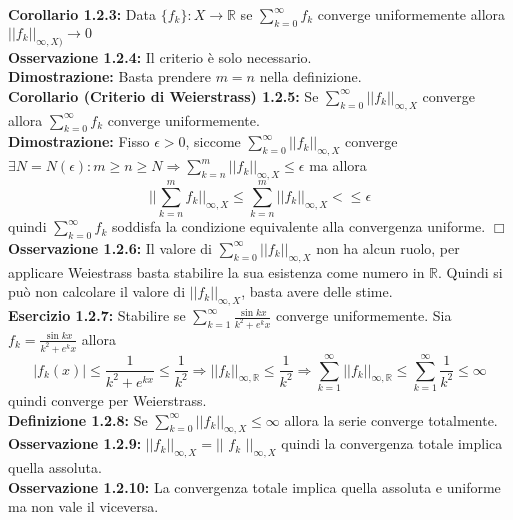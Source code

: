 \documentclass[a4paper,11pt,titlepage]{book}
\begin{document}
\textbf{Corollario 1.2.3:} Data $\{f_{k}\}:X\rightarrow\mathbb{R}$ se $\sum_{k=0}^\infty f_{k}$ converge uniformemente allora $||f_k||_{\infty,X)}\to 0$\\

\textbf{Osservazione 1.2.4:} Il criterio è solo necessario.\\

\textbf{Dimostrazione:} Basta prendere $m=n$ nella definizione. \\

\textbf{Corollario (Criterio di Weierstrass) 1.2.5:} Se $\sum_{k=0}^{\infty}||f_k||_{\infty,X}$ converge allora $\sum_{k=0}^{\infty}f_k$ converge uniformemente. \\

\textbf{Dimostrazione:} Fisso $\epsilon >0$, siccome $\sum_{k=0}^{\infty}||f_k||_{\infty,X}$ converge $\exists N=N(\epsilon): m\geq n\geq N \Rightarrow \sum_{k=n}^{m} ||f_{k}||_{\infty,X}\leq\epsilon$ ma allora $$||\sum_{k=n}^{m}f_{k}||_{\infty,X}\leq\sum_{k=n}^{m} ||f_{k}||_{\infty,X}<\leq\epsilon$$ quindi $\sum_{k=0}^\infty f_{k}$ soddisfa la condizione equivalente alla convergenza uniforme. $\Box$\\

\textbf{Osservazione 1.2.6:} Il valore di $\sum_{k=0}^{\infty}||f_k||_{\infty,X}$ non ha alcun ruolo, per applicare Weiestrass basta stabilire la sua esistenza come numero in $\mathbb{R}$. Quindi si può non calcolare il valore di $||f_k||_{\infty,X}$, basta avere delle  stime.\\

\textbf{Esercizio 1.2.7:} Stabilire se $\sum_{k=1}^{\infty}\frac{\sin{kx}}{k^2+e^kx}$ converge uniformemente.
Sia $f_k=\frac{\sin{kx}}{k^2+e^kx}$ allora $$|f_k(x)|\leq\frac{1}{k^2+e^{kx}}\leq\frac{1}{k^2}\Rightarrow ||f_k||_{\infty,\mathbb{R}}\leq\frac{1}{k^2}\Rightarrow\sum_{k=1}^{\infty}||f_k||_{\infty,\mathbb{R}}\leq\sum_{k=1}^{\infty}\frac{1}{k^2}\leq\infty$$ quindi converge per Weierstrass.\\

\textbf{Definizione 1.2.8:} Se $\sum_{k=0}^{\infty}||f_k||_{\infty,X}\leq\infty$ allora la serie converge totalmente.\\

\textbf{Osservazione 1.2.9:} $||f_k||_{\infty,X}=||$ $f_k$ $||_{\infty,X}$ quindi la convergenza totale implica quella assoluta.\\

\textbf{Osservazione 1.2.10:} La convergenza totale implica quella assoluta e uniforme ma non vale il viceversa.\\
\end{document}
